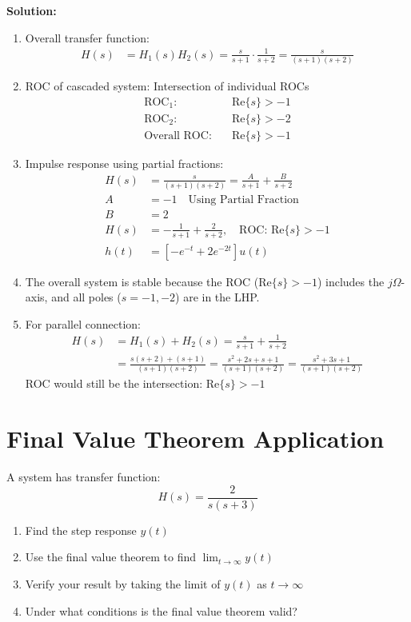 \documentclass{article}
\begin{document}
\textbf{Solution:}
\begin{enumerate}[label=(\alph*)]
    \item Overall transfer function:
    \begin{align*}
        H(s) &= H_1(s)H_2(s) = \frac{s}{s + 1} \cdot \frac{1}{s + 2} = \frac{s}{(s + 1)(s + 2)}
    \end{align*}
    
    \item ROC of cascaded system: Intersection of individual ROCs
    \begin{align*}
        \text{ROC}_1: & \quad \text{Re}\{s\} > -1 \\
        \text{ROC}_2: & \quad \text{Re}\{s\} > -2 \\
        \text{Overall ROC}: & \quad \text{Re}\{s\} > -1
    \end{align*}
    
    \item Impulse response using partial fractions:
    \begin{align*}
        H(s) &= \frac{s}{(s + 1)(s + 2)} = \frac{A}{s + 1} + \frac{B}{s + 2} \\
        A & = -1 \quad \text{Using Partial Fraction} \\
        B & = 2 \\
        H(s) &= -\frac{1}{s + 1} + \frac{2}{s + 2}, \quad \text{ROC: } \text{Re}\{s\} > -1 \\
        h(t) &= [-e^{-t} + 2e^{-2t}]u(t)
    \end{align*}
    
    \item The overall system is stable because the ROC ($\text{Re}\{s\} > -1$) includes the $j\Omega$-axis, and all poles ($s = -1, -2$) are in the LHP.
    
    \item For parallel connection:
    \begin{align*}
        H(s) &= H_1(s) + H_2(s) = \frac{s}{s + 1} + \frac{1}{s + 2} \\
        &= \frac{s(s + 2) + (s + 1)}{(s + 1)(s + 2)} = \frac{s^2 + 2s + s + 1}{(s + 1)(s + 2)} = \frac{s^2 + 3s + 1}{(s + 1)(s + 2)}
    \end{align*}
    ROC would still be the intersection: $\text{Re}\{s\} > -1$
\end{enumerate}

\section{Final Value Theorem Application}
A system has transfer function:
\[ H(s) = \frac{2}{s(s + 3)} \]
\begin{enumerate}[label=(\alph*)]
    \item Find the step response $y(t)$
    \item Use the final value theorem to find $\lim_{t\to\infty} y(t)$
    \item Verify your result by taking the limit of $y(t)$ as $t\to\infty$
    \item Under what conditions is the final value theorem valid?
\end{enumerate}
\end{document}
